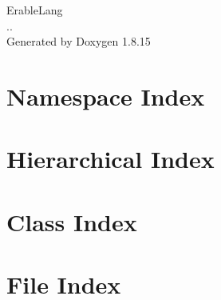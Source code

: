 \let\mypdfximage\pdfximage\def\pdfximage{\immediate\mypdfximage}\documentclass[twoside]{book}
\newcommand{\+}{\discretionary{\mbox{\scriptsize$\hookleftarrow$}}{}{}}
\newcommand{\clearemptydoublepage}{%
  \newpage{\pagestyle{empty}\cleardoublepage}%
}
\begin{document}
\hypersetup{pageanchor=false,
             bookmarksnumbered=true,
             pdfencoding=unicode
            }
\begin{titlepage}
\vspace*{7cm}
\begin{center}%
{\Large Erable\+Lang \\[1ex]\large .. }\\
\vspace*{1cm}
{\large Generated by Doxygen 1.8.15}\\
\end{center}
\end{titlepage}
\clearemptydoublepage
{}
\tableofcontents
\clearemptydoublepage
{}
\hypersetup{pageanchor=true}

\chapter{Namespace Index}

\chapter{Hierarchical Index}

\chapter{Class Index}

\chapter{File Index}

\end{document}
